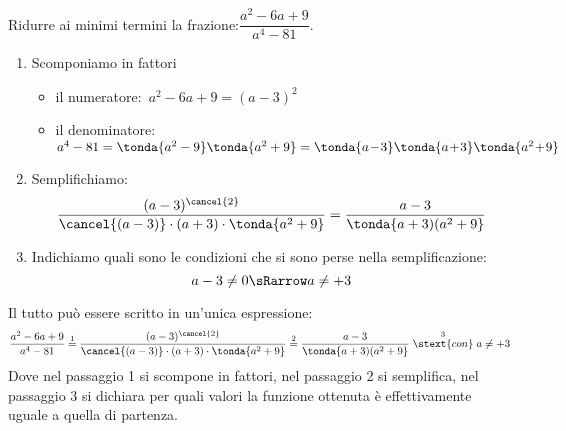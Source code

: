 \begin{esempio}{}{}
Ridurre ai minimi termini la frazione:\quad \(\dfrac{a^{2}-6a+9}{a^{4}-81}\).
\begin{enumerate} [left=0mm]
\item Scomponiamo in fattori
\begin{itemize}[left=0mm, nosep]
\item il numeratore:~\(a^2 - 6a +9 = (a - 3 )^2\)
\item il denominatore:~\(a^4 - 81 = \tonda{a^2 - 9} \tonda{a^2 + 9} = 
                         \tonda{a\!-\!3}\tonda{a\!+\!3} \tonda{a^2\!+\!9} \)
\end{itemize}
\item Semplifichiamo:
\[\dfrac{(a-3)^{\cancel{2}}}
        {\cancel{(a-3)}\cdot (a+3)\cdot  \tonda{a^{2}+9} }=
  \dfrac{a-3}{\tonda{a+3)(a^{2}+9}}\]
\item Indichiamo quali sono le condizioni che si sono perse nella 
semplificazione:
\[a-3 \neq 0 \sRarrow a \neq +3\]
\end{enumerate}
Il tutto può essere scritto in un'unica espressione:
\[\dfrac{a^{2}-6a+9}{a^{4}-81} \stackrel{1}{=} 
  \dfrac{(a-3)^{\cancel{2}}}
        {\cancel{(a-3)}\cdot (a+3)\cdot \tonda{a^{2}+9}}\stackrel{2}{=} 
  \dfrac{a-3}{ \tonda{a+3)(a^{2}+9}} \stackrel{3}{\stext{con}} 
  a \neq +3\]
Dove nel passaggio 1 si scompone in fattori, nel passaggio 2 si semplifica, 
nel passaggio 3 si dichiara per quali valori la funzione ottenuta è 
effettivamente uguale a quella di partenza.
\end{esempio}


